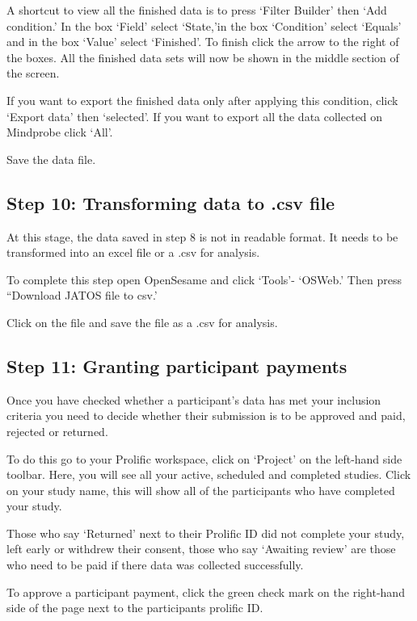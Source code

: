 \documentclass[
  12pt,
]{book}
\begin{document}
A shortcut to view all the finished data is to press `Filter Builder' then `Add condition.' In the box `Field' select `State,'in the box `Condition' select `Equals' and in the box `Value' select `Finished'. To finish click the arrow to the right of the boxes. All the finished data sets will now be shown in the middle section of the screen.

If you want to export the finished data only after applying this condition, click `Export data' then `selected'. If you want to export all the data collected on Mindprobe click `All'.

Save the data file.

\subsection{Step 10: Transforming data to .csv file}\label{step-10-transforming-data-to-.csv-file}

At this stage, the data saved in step 8 is not in readable format. It needs to be transformed into an excel file or a .csv for analysis.

To complete this step open OpenSesame and click `Tools'- `OSWeb.' Then press ``Download JATOS file to csv.'

Click on the file and save the file as a .csv for analysis.

\subsection{Step 11: Granting participant payments}\label{step-11-granting-participant-payments}

Once you have checked whether a participant's data has met your inclusion criteria you need to decide whether their submission is to be approved and paid, rejected or returned.

To do this go to your Prolific workspace, click on `Project' on the left-hand side toolbar. Here, you will see all your active, scheduled and completed studies. Click on your study name, this will show all of the participants who have completed your study.

Those who say `Returned' next to their Prolific ID did not complete your study, left early or withdrew their consent, those who say `Awaiting review' are those who need to be paid if there data was collected successfully.

To approve a participant payment, click the green check mark on the right-hand side of the page next to the participants prolific ID.
\end{document}
